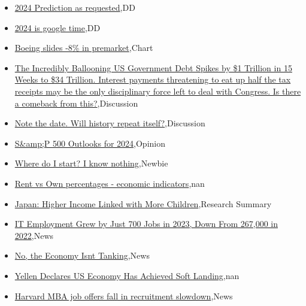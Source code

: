 \documentclass{article}%
\begin{document}
%
\begin{itemize}%
\item%
\href{https://reddit.com/r/wallstreetbets/comments/191jvo8/2024\_prediction\_as\_requested/}{2024 Prediction as requested},DD%
\item%
\href{https://reddit.com/r/wallstreetbets/comments/191iefv/2024\_is\_google\_time/}{2024 is google time},DD%
\item%
\href{https://reddit.com/r/wallstreetbets/comments/191hf4v/boeing\_slides\_8\_in\_premarket/}{Boeing slides -8\% in premarket},Chart%
\item%
\href{https://reddit.com/r/StockMarket/comments/191fig9/the\_incredibly\_ballooning\_us\_government\_debt/}{The Incredibly Ballooning US Government Debt Spikes by \$1 Trillion in 15 Weeks to \$34 Trillion. Interest payments threatening to eat up half the tax receipts may be the only disciplinary force left to deal with Congress. Is there a comeback from this?},Discussion%
\item%
\href{https://reddit.com/r/StockMarket/comments/191bt98/note\_the\_date\_will\_history\_repeat\_itself/}{Note the date. Will history repeat itself?},Discussion%
\item%
\href{https://reddit.com/r/StockMarket/comments/190pc6s/sp\_500\_outlooks\_for\_2024/}{S\&amp;P 500 Outlooks for 2024},Opinion%
\item%
\href{https://reddit.com/r/StockMarket/comments/190dzmq/where\_do\_i\_start\_i\_know\_nothing/}{Where do I start? I know nothing},Newbie%
\item%
\href{https://reddit.com/r/Economics/comments/191c3kj/rent\_vs\_own\_percentages\_economic\_indicators/}{Rent vs Own percentages - economic indicators},nan%
\item%
\href{https://reddit.com/r/Economics/comments/1913w0f/japan\_higher\_income\_linked\_with\_more\_children/}{Japan: Higher Income Linked with More Children},Research Summary%
\item%
\href{https://reddit.com/r/Economics/comments/191276m/it\_employment\_grew\_by\_just\_700\_jobs\_in\_2023\_down/}{IT Employment Grew by Just 700 Jobs in 2023, Down From 267,000 in 2022},News%
\item%
\href{https://reddit.com/r/Economics/comments/1911y6j/no\_the\_economy\_isnt\_tanking/}{No, the Economy Isnt Tanking},News%
\item%
\href{https://reddit.com/r/Economics/comments/190zuke/yellen\_declares\_us\_economy\_has\_achieved\_soft/}{Yellen Declares US Economy Has Achieved Soft Landing},nan%
\item%
\href{https://reddit.com/r/Economics/comments/190zg97/harvard\_mba\_job\_offers\_fall\_in\_recruitment/}{Harvard MBA job offers fall in recruitment slowdown},News%
\end{itemize}%
\end{document}
